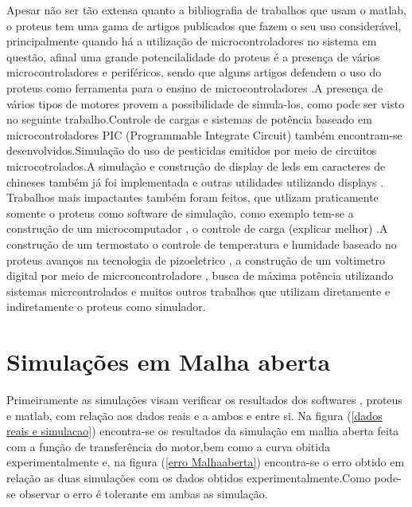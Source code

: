 \documentclass{Fabiano_file}
\begin{document}
{Apesar não ser tão extensa quanto a bibliografia de trabalhos que usam o matlab, o proteus tem uma gama de artigos publicados que fazem o seu uso considerável,
principalmente quando há a utilização de microcontroladores no sistema em questão, afinal uma grande potencilalidade do proteus é a presença de vários 
microcontroladores e periféricos, sendo que alguns artigos defendem o uso do proteus como ferramenta para o ensino de microcontroladores
\cite{Ensino_proteus_uc}\cite{proteus_educacao}.A presença de vários tipos de motores provem a possibilidade de simula-los, como pode ser visto no seguinte 
trabalho\cite{motor_brushless}.Controle de cargas  e sistemas de potência baseado em microcontroladores PIC (Programmable Integrate Circuit) também 
encontram-se desenvolvidos\cite{busca_de_maxima_potencia_com_sistemas_microcontrolados}.Simulação do  uso de pesticidas emitidos por meio de circuitos 
microcotrolados\cite{pesticida}.A simulação e construção de display de leds em caracteres de chineses também já foi implementada \cite{caracteres_chineses}e 
outras utilidades utilizando displays \cite{simulacao_led_proteus_display}.\\
Trabalhos mais impactantes também foram feitos, que utlizam praticamente somente o proteus como software de simulação, como exemplo tem-se a construção 
de um microcomputador \cite{contrucao_microconputador_proteus}, o controle de carga (explicar melhor) \cite{controle_de_carga}.A construção de 
um termostato \cite{termostato} o controle de temperatura e humidade baseado no proteus \cite{controle_de_temperatura} avanços na tecnologia de 
pizoeletrico \cite{pizoeletrico}, a construção de um voltimetro digital por meio de micrconcontroladore \cite{voltimetro_digital}, busca de máxima 
potência utilizando sistemas micrcontrolados \cite{busca_de_maxima_potencia_com_sistemas_microcontrolados} e muitos outros trabalhos que utilizam diretamente 
e indiretamente o proteus como simulador.


\section{Simulações em Malha aberta}
Primeiramente as simulações visam verificar os resultados dos softwares , proteus e matlab, com relação aos dados reais e a ambos e entre si.
Na figura (\ref{dados reais e simulacao}) encontra-se os resultados da simulação em malha aberta feita com a função de transferência do motor,bem como a 
curva obitida experimentalmente e, na figura (\ref{erro Malhaaberta}) encontra-se o erro obtido em relação as duas simulações com os dados obtidos 
experimentalmente.Como pode-se observar o erro é tolerante em ambas as simulação.


}
\end{document}
